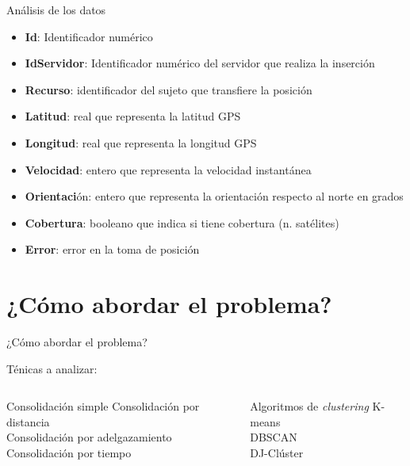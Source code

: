 \documentclass[10pt, spanish]{beamer}
\begin{document}
\begin{frame}{An\'alisis de los datos}
  \begin{itemize}[<+- | alert@+>]    
\item \textbf{Id}: Identificador num\'erico
\item \textbf{IdServidor}: Identificador num\'erico del servidor que realiza la inserci\'on
\item \textbf{Recurso}: identificador del sujeto que transfiere la posici\'on
\item \textbf{Latitud}: real que representa la latitud GPS
\item \textbf{Longitud}: real que representa la longitud GPS
\item \textbf{Velocidad}: entero que representa la velocidad instant\'anea
\item \textbf{Orientaci}\'on: entero que representa la orientaci\'on respecto al norte en grados
\item \textbf{Cobertura}: booleano que indica si tiene cobertura (n. sat\'elites)
\item \textbf{Error}: error en la toma de posici\'on
  \end{itemize}
\end{frame}

\section{¿C\'omo abordar el problema?}
\begin{frame}{¿C\'omo abordar el problema?}

T\'enicas a analizar:

  \begin{columns}[T,onlytextwidth]
    
      \begin{exampleblock}{Consolidaci\'on simple}
        Consolidaci\'on por distancia\\
        Consolidaci\'on por adelgazamiento\\
        Consolidaci\'on por tiempo
      \end{exampleblock}


      \begin{exampleblock}{Algoritmos de \textit{clustering}}
        K-means\\
        DBSCAN\\
        DJ-Cl\'uster
      \end{exampleblock}

  \end{columns}


\end{frame}
\end{document}
